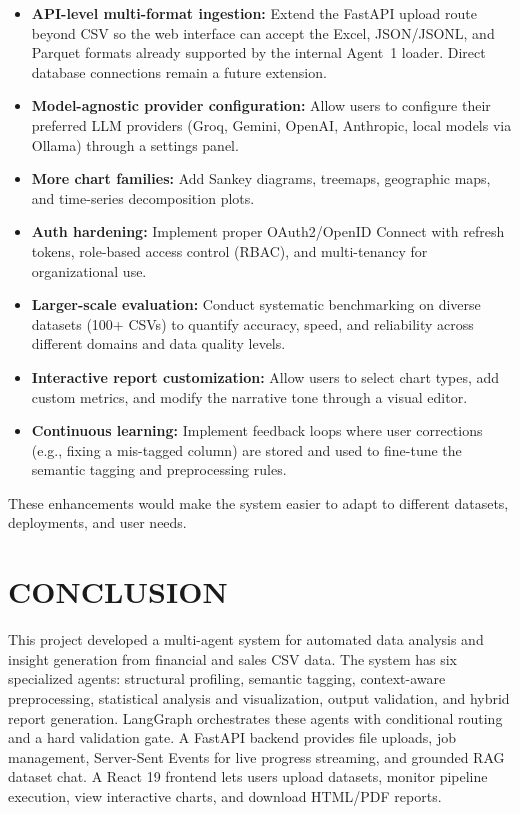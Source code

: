 \documentclass[12pt,a4paper,openany]{report}
\begin{document}
\begin{itemize}
	\item \textbf{API-level multi-format ingestion:} Extend the FastAPI upload route beyond CSV so the web interface can accept the Excel, JSON/JSONL, and Parquet formats already supported by the internal Agent~1 loader. Direct database connections remain a future extension.
	\item \textbf{Model-agnostic provider configuration:} Allow users to configure their preferred LLM providers (Groq, Gemini, OpenAI, Anthropic, local models via Ollama) through a settings panel.
	\item \textbf{More chart families:} Add Sankey diagrams, treemaps, geographic maps, and time-series decomposition plots.
	\item \textbf{Auth hardening:} Implement proper OAuth2/OpenID Connect with refresh tokens, role-based access control (RBAC), and multi-tenancy for organizational use.
	\item \textbf{Larger-scale evaluation:} Conduct systematic benchmarking on diverse datasets (100+ CSVs) to quantify accuracy, speed, and reliability across different domains and data quality levels.
	\item \textbf{Interactive report customization:} Allow users to select chart types, add custom metrics, and modify the narrative tone through a visual editor.
	\item \textbf{Continuous learning:} Implement feedback loops where user corrections (e.g., fixing a mis-tagged column) are stored and used to fine-tune the semantic tagging and preprocessing rules.
\end{itemize}

These enhancements would make the system easier to adapt to different datasets, deployments, and user needs.

\chapter{CONCLUSION}

This project developed a multi-agent system for automated data analysis and insight generation from financial and sales CSV data. The system has six specialized agents: structural profiling, semantic tagging, context-aware preprocessing, statistical analysis and visualization, output validation, and hybrid report generation. LangGraph orchestrates these agents with conditional routing and a hard validation gate. A FastAPI backend provides file uploads, job management, Server-Sent Events for live progress streaming, and grounded RAG dataset chat. A React 19 frontend lets users upload datasets, monitor pipeline execution, view interactive charts, and download HTML/PDF reports.
\end{document}

